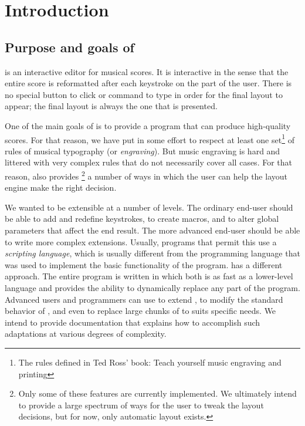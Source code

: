 \chapter{Introduction}
\setcounter{page}{1}

\section{Purpose and goals of {\gs}}

{\gs} is an interactive editor for musical scores.  It is interactive
in the sense that the entire score is reformatted after each keystroke
on the part of the user.  There is no special button to click or
command to type in order for the final layout to appear; the final
layout is always the one that is presented. 

One of the main goals of {\gs} is to provide a program that can
produce high-quality scores.  For that reason, we have put in some
effort to respect at least one set\footnote{The rules defined in Ted
Ross' book: Teach yourself music engraving and printing} of rules of
musical typography (or \emph{engraving}).  But music
engraving is hard and littered with very complex rules that do not
necessarily cover all cases.  For that reason, {\gs} also provides
\footnote{Only some of these features are currently implemented.  We
ultimately intend to provide a large spectrum of ways for the user to
tweak the layout decisions, but for now, only automatic layout
exists.} a number of ways in which the user can help the layout engine
make the right decision.

We wanted {\gs} to be extensible at a number of levels.  The ordinary
end-user should be able to add and redefine keystrokes, to create
macros, and to alter global parameters that affect the end result.
The more advanced end-user should be able to write more complex
extensions.  Usually, programs that permit this use a \emph{scripting
language}, which is usually different from the programming language
that was used to implement the basic functionality of the program.
{\gs} has a different approach.  The entire program is written in
{\commonlisp} which both is as fast as a lower-level language and
provides the ability to dynamically replace any part of the program.
Advanced users and programmers can use {\commonlisp} to extend {\gs},
to modify the standard behavior of {\gs}, and even to replace large
chunks of {\gs} to suits specific needs.  We intend to provide
documentation that explains how to accomplish such adaptations at
various degrees of complexity.

